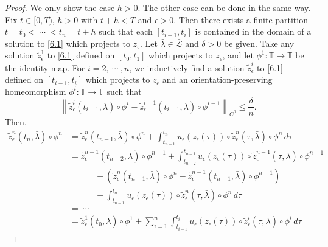 \documentclass[reqno,centertags,12pt]{amsart}
\theoremstyle{definition}
\numberwithin{equation}{section}
\newcommand{\norm}[1]{\left\|#1\right\|}
\newcommand{\bbT}{{\mathbb{T}}}
\begin{document}
\begin{proof}
    We only show the case $h>0$. The other case can be done in the same way.
    Fix $t\in[0,T)$, $h>0$ with $t+h<T$ and $\epsilon>0$.
    Then there exists a finite partition
    $t=t_{0}<\ \cdots\ <t_{n}=t+h$ such that each $[t_{i-1},t_{i}]$
    is contained in the domain of a solution to \eqref{6.1}
    which projects to $z_{\epsilon}$. Let $\bar{\lambda}\in\bar{\mathcal{L}}$ and
    $\delta>0$ be given. Take any solution
    $\tilde{z}_{\epsilon}^{1}$ to \eqref{6.1} defined on
    $[t_{0},t_{1}]$ which projects to $z_{\epsilon}$, and let $\phi^{1}\colon\bbT\to\bbT$
    be the identity map. For $i=2,\ \cdots\ ,n$, we inductively find
    a solution $\tilde{z}_{\epsilon}^{i}$ to \eqref{6.1}
    defined on $[t_{i-1},t_{i}]$ which projects to $z_{\epsilon}$
    and an orientation-preserving homeomorphism $\phi^{i}\colon\bbT\to\bbT$ such that
    \[
        \norm{\tilde{z}_{\epsilon}^{i}(t_{i-1},\bar{\lambda})\circ\phi^{i}
        - \tilde{z}_{\epsilon}^{i-1}(t_{i-1},\bar{\lambda})\circ\phi^{i-1}}_{C^{0}}
        \leq \frac{\delta}{n}.
    \]
    Then,
    \begin{align*}
        \tilde{z}_{\epsilon}^{n}(t_{n},\bar{\lambda})\circ\phi^{n}
        &= \tilde{z}_{\epsilon}^{n}(t_{n-1},\bar{\lambda})\circ\phi^{n}
        + \int_{t_{n-1}}^{t_{n}}
        u_{\epsilon}(z_{\epsilon}(\tau))
        \circ \tilde{z}_{\epsilon}^{n}(\tau,\bar{\lambda})
        \circ \phi^{n}
        \,d\tau \\
        &= \tilde{z}_{\epsilon}^{n-1}(t_{n-2},\bar{\lambda})\circ\phi^{n-1}
        + \int_{t_{n-2}}^{t_{n-1}}
        u_{\epsilon}(z_{\epsilon}(\tau))
        \circ \tilde{z}_{\epsilon}^{n-1}(\tau,\bar{\lambda})
        \circ \phi^{n-1}
        \\&\quad\quad\quad
        + \left(\tilde{z}_{\epsilon}^{n}(t_{n-1},\bar{\lambda})\circ\phi^{n}
        - \tilde{z}_{\epsilon}^{n-1}(t_{n-1},\bar{\lambda})\circ\phi^{n-1}\right)
        \\&\quad\quad\quad
        + \int_{t_{n-1}}^{t_{n}}
        u_{\epsilon}(z_{\epsilon}(\tau))
        \circ \tilde{z}_{\epsilon}^{n}(\tau,\bar{\lambda})
        \circ \phi^{n}
        \,d\tau \\
        &=\ \cdots\ \\
        &=\tilde{z}_{\epsilon}^{1}(t_{0},\bar{\lambda})\circ\phi^{1}
        + \sum_{i=1}^{n} \int_{t_{i-1}}^{t_{i}}
        u_{\epsilon}(z_{\epsilon}(\tau))
        \circ \tilde{z}_{\epsilon}^{i}(\tau,\bar{\lambda})
        \circ \phi^{i}
        \,d\tau

\end{align*}
\end{proof}
\end{document}
